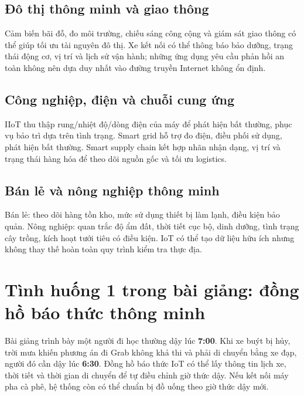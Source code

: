 \subsection{Đô thị thông minh và giao thông}
Cảm biến bãi đỗ, đo môi trường, chiếu sáng công cộng và giám sát giao thông có thể giúp tối ưu tài nguyên đô thị. Xe kết nối có thể thông báo bảo dưỡng, trạng thái động cơ, vị trí và lịch sử vận hành; những ứng dụng yêu cầu phản hồi an toàn không nên dựa duy nhất vào đường truyền Internet không ổn định.
\subsection{Công nghiệp, điện và chuỗi cung ứng}
IIoT thu thập rung/nhiệt độ/dòng điện của máy để phát hiện bất thường, phục vụ bảo trì dựa trên tình trạng. Smart grid hỗ trợ đo điện, điều phối sử dụng, phát hiện bất thường. Smart supply chain kết hợp nhãn nhận dạng, vị trí và trạng thái hàng hóa để theo dõi nguồn gốc và tối ưu logistics.
\subsection{Bán lẻ và nông nghiệp thông minh}
Bán lẻ: theo dõi hàng tồn kho, mức sử dụng thiết bị làm lạnh, điều kiện bảo quản. Nông nghiệp: quan trắc độ ẩm đất, thời tiết cục bộ, dinh dưỡng, tình trạng cây trồng, kích hoạt tưới tiêu có điều kiện. IoT có thể tạo dữ liệu hữu ích nhưng không thay thế hoàn toàn quy trình kiểm tra thực địa.

\section{Tình huống 1 trong bài giảng: đồng hồ báo thức thông minh}
Bài giảng trình bày một người đi học thường dậy lúc \textbf{7:00}. Khi xe buýt bị hủy, trời mưa khiến phương án đi Grab không khả thi và phải di chuyển bằng xe đạp, người đó cần dậy lúc \textbf{6:30}. Đồng hồ báo thức IoT có thể lấy thông tin lịch xe, thời tiết và thời gian di chuyển để tự điều chỉnh giờ thức dậy. Nếu kết nối máy pha cà phê, hệ thống còn có thể chuẩn bị đồ uống theo giờ thức dậy mới.

